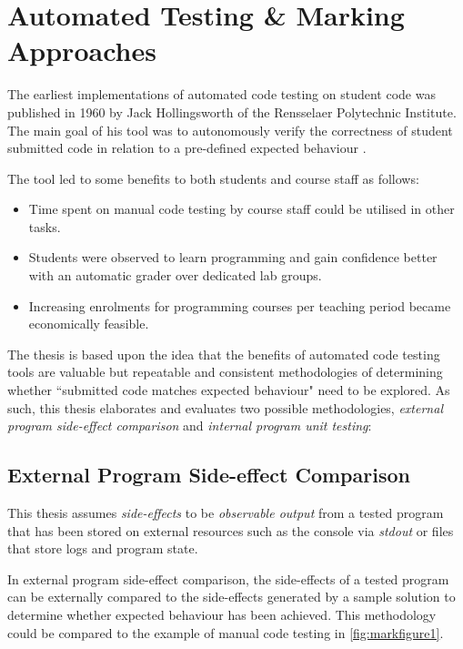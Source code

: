 \documentclass[hidelinks]{report}
\begin{document}
\section{Automated Testing \& Marking Approaches}

The earliest implementations of automated code testing on student code was published in 1960 by Jack Hollingsworth of the Rensselaer Polytechnic Institute. The main goal of his tool was to autonomously verify the correctness of student submitted code in relation to a pre-defined expected behaviour \cite{AutomatedFirst}.

The tool led to some benefits to both students and course staff as follows:
\begin{itemize}
	\item Time spent on manual code testing by course staff could be utilised in other tasks.
	\item Students were observed to learn programming and gain confidence better with an automatic grader over dedicated lab groups.
	\item Increasing enrolments for programming courses per teaching period became economically feasible.
\end{itemize}

The thesis is based upon the idea that the benefits of automated code testing tools are valuable but repeatable and consistent methodologies of determining whether ``submitted code matches expected behaviour" need to be explored. As such, this thesis elaborates and evaluates two possible methodologies, \textit{external program side-effect comparison} and \textit{internal program unit testing}:

\subsection{External Program Side-effect Comparison}

This thesis assumes \textit{side-effects} to be \textit{observable output} from a tested program that has been stored on external resources such as the console via \textit{stdout} or files that store logs and program state.

In external program side-effect comparison, the side-effects of a tested program can be externally compared to the side-effects generated by a sample solution to determine whether expected behaviour has been achieved. This methodology could be compared to the example of manual code testing in \autoref{fig:markfigure1}.
\end{document}
